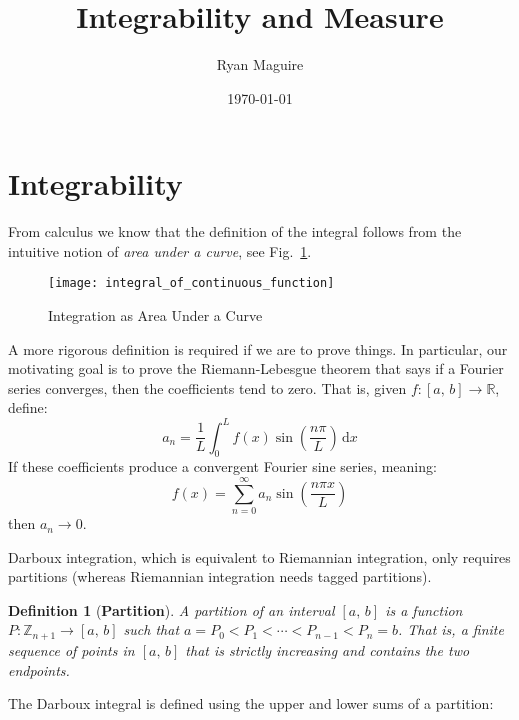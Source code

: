 \documentclass{article}
\title{Integrability and Measure}
\author{Ryan Maguire}
\date{\today}
\theoremstyle{normal}
\newtheorem{definition}{Definition}
\begin{document}
    \maketitle
    \section{Integrability}
        From calculus we know that the definition of the integral follows
        from the intuitive notion of \textit{area under a curve},
        see Fig.~\ref{fig:integral_of_continuous_function}.
        \begin{figure}
            \centering
            \texttt{[image: integral\_of\_continuous\_function]}
            \caption{Integration as Area Under a Curve}
            \label{fig:integral_of_continuous_function}
        \end{figure}
        A more rigorous definition is required if we are to prove things.
        In particular, our motivating goal is to prove the Riemann-Lebesgue
        theorem that says if a Fourier series converges, then the coefficients
        tend to zero. That is, given $f:[a,\,b]\rightarrow\mathbb{R}$, define:
        \begin{equation}
            a_{n}=
            \frac{1}{L}\int_{0}^{L}
                f(x)\sin\left(\frac{n\pi}{L}\right)\,\textrm{d}x
        \end{equation}
        If these coefficients produce a convergent Fourier sine series, meaning:
        \begin{equation}
            f(x)=\sum_{n=0}^{\infty}a_{n}\sin\left(\frac{n\pi{x}}{L}\right)
        \end{equation}
        then $a_{n}\rightarrow{0}$.
        \par\hfill\par
        Darboux integration, which is equivalent to Riemannian integration,
        only requires partitions (whereas Riemannian integration needs
        tagged partitions).
        \begin{definition}[\textbf{Partition}]
            A partition of an interval $[a,\,b]$ is a function
            $P:\mathbb{Z}_{n+1}\rightarrow[a,\,b]$ such that
            $a=P_{0}<P_{1}<\cdots<P_{n-1}<P_{n}=b$. That is, a finite sequence
            of points in $[a,\,b]$ that is strictly increasing and contains
            the two endpoints.
        \end{definition}
        The Darboux integral is defined using the upper and lower sums of a
        partition:
\end{document}
